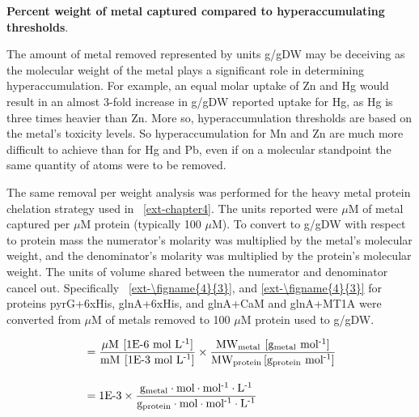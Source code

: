 \documentclass[../main/main]{subfiles}
\begin{document}
\begin{table}[H]
  \centering
  \small
  \singlespacing
  \def\arraystretch{1.5} %
  
  \caption[Percent weight of metal captured compared to hyperaccumulating thresholds]
  {
    \textbf{Percent weight of metal captured compared to hyperaccumulating thresholds}.
  }
  \label{hyper-threshold-table}
\end{table}

The amount of metal removed represented by units g/gDW may be deceiving as the molecular weight of the metal plays a significant role in determining hyperaccumulation. For example, an equal molar uptake of Zn and Hg would result in an almost 3-fold increase in g/gDW reported uptake for Hg, as Hg is three times heavier than Zn. More so, hyperaccumulation thresholds are based on the metal's toxicity levels. So hyperaccumulation for Mn and Zn are much more difficult to achieve than for Hg and Pb, even if on a molecular standpoint the same quantity of atoms were to be removed.

The same removal per weight analysis was performed for the heavy metal protein chelation strategy used in \CHAPTER~\ref{ext-chapter4}. The units reported were $\mu$M of metal captured per $\mu$M protein (typically 100 $\mu$M). To convert to g/gDW with respect to protein mass the numerator's molarity was multiplied by the metal's molecular weight, and the denominator's molarity was multiplied by the protein's molecular weight. The units of volume shared between the numerator and denominator cancel out. Specifically \FIGURE~\ref{ext-\figname{4}{3}}, and \ref{ext-\figname{4}{3}} for proteins pyrG+6xHis, glnA+6xHis, and glnA+CaM and glnA+MT1A were converted from $\mu$M of metals removed to 100 $\mu$M protein used to g/gDW.

\begin{align}
  &=
  \dfrac{\mu\text{M}\:\left[ \text{1E-6 mol L\textsuperscript{-1}} \right]}
    {\text{mM}\:\left[ \text{1E-3 mol L\textsuperscript{-1}} \right]}
  \times
  \dfrac{\text{MW\textsubscript{metal}}\:\left[ \text{g\textsubscript{metal} mol\textsuperscript{-1}}\right]}
    {\text{MW\textsubscript{protein}}\left[ \text{g\textsubscript{protein} mol\textsuperscript{-1}}\right]}
  \\[1em]
  &=
  \text{1E-3}
  \times
  \dfrac{\text{g\textsubscript{metal}} \cdot \text{mol} \cdot \text{mol\textsuperscript{-1}} \cdot \text{L\textsuperscript{-1}}}
    {\text{g\textsubscript{protein}} \cdot \text{mol} \cdot \text{mol\textsuperscript{-1}} \cdot \text{L\textsuperscript{-1}}}
\end{align}
\end{document}
